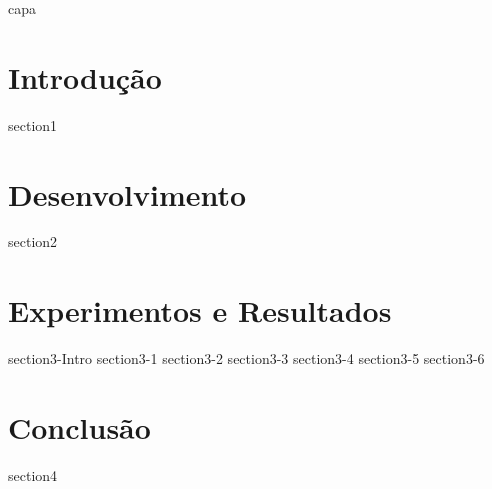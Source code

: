 \documentclass[11pt,a4paper]{article}
\begin{document}
    {capa} 
    \myemptypage %
    \thispagestyle{empty}
    \listoffigures
    \listoftables
    \newpage
    \tableofcontents
    \newpage
    \setlength{\parindent}{0cm}
    \part{Introdução}
        {section1}
    \part{Desenvolvimento}
        {section2}
    \part{Experimentos e Resultados}
        {section3-Intro}
        {section3-1}
        {section3-2}
        {section3-3}
        {section3-4}
        {section3-5}
        {section3-6}
    \part{Conclusão}
        {section4}
\end{document}
